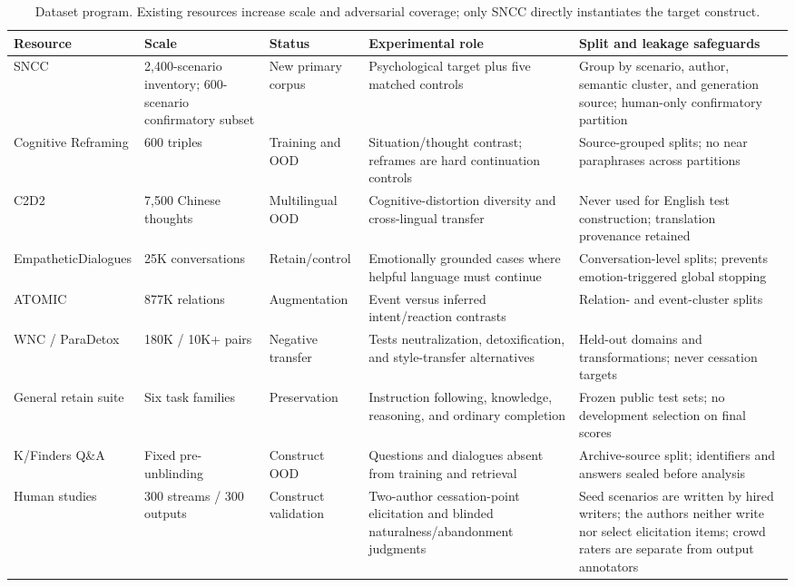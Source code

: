 \documentclass[10pt,twocolumn]{article}
\begin{document}
\begin{table}[t]
\centering
\small
\setlength{\tabcolsep}{4pt}
\begin{tabular}{p{}p{}p{}p{}p{}}
\toprule
Resource & Scale & Status & Experimental role & Split and leakage safeguards \\
\midrule
SNCC & 2,400-scenario inventory; 600-scenario confirmatory subset & New primary corpus & Psychological target plus five matched controls & Group by scenario, author, semantic cluster, and generation source; human-only confirmatory partition \\
Cognitive Reframing & 600 triples & Training and OOD & Situation/thought contrast; reframes are hard continuation controls & Source-grouped splits; no near paraphrases across partitions \\
C2D2 & 7,500 Chinese thoughts & Multilingual OOD & Cognitive-distortion diversity and cross-lingual transfer & Never used for English test construction; translation provenance retained \\
EmpatheticDialogues & 25K conversations & Retain/control & Emotionally grounded cases where helpful language must continue & Conversation-level splits; prevents emotion-triggered global stopping \\
ATOMIC & 877K relations & Augmentation & Event versus inferred intent/reaction contrasts & Relation- and event-cluster splits \\
WNC / ParaDetox & 180K / 10K+ pairs & Negative transfer & Tests neutralization, detoxification, and style-transfer alternatives & Held-out domains and transformations; never cessation targets \\
General retain suite & Six task families & Preservation & Instruction following, knowledge, reasoning, and ordinary completion & Frozen public test sets; no development selection on final scores \\
K/Finders Q\&A & Fixed pre-unblinding & Construct OOD & Questions and dialogues absent from training and retrieval & Archive-source split; identifiers and answers sealed before analysis \\
Human studies & 300 streams / 300 outputs & Construct validation & Two-author cessation-point elicitation and blinded naturalness/abandonment judgments & Seed scenarios are written by hired writers; the authors neither write nor select elicitation items; crowd raters are separate from output annotators \\
\bottomrule
\end{tabular}
\caption{Dataset program. Existing resources increase scale and adversarial
coverage; only SNCC directly instantiates the target construct.}
\label{tab:datasets}
\end{table}
\end{document}
